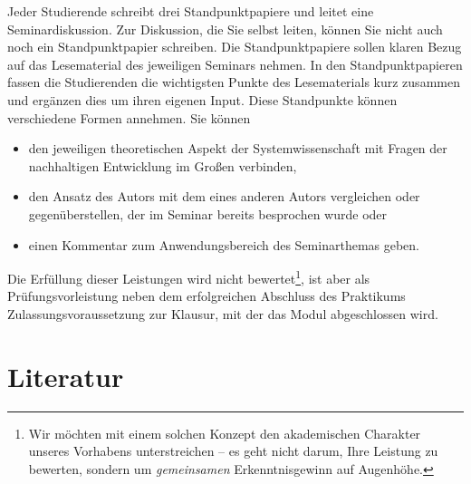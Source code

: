 \documentclass[11pt,a4paper]{article}
\begin{document}
Jeder Studierende schreibt drei Standpunktpapiere und leitet eine
Seminardiskussion.  Zur Diskussion, die Sie selbst leiten, können Sie nicht
auch noch ein Standpunktpapier schreiben. Die Standpunktpapiere sollen klaren
Bezug auf das Lesematerial des jeweiligen Seminars nehmen. In den
Standpunktpapieren fassen die Studierenden die wichtigsten Punkte des
Lesematerials kurz zusammen und ergänzen dies um ihren eigenen Input. Diese
Standpunkte können verschiedene Formen annehmen. Sie können
\begin{itemize}
\item den jeweiligen theoretischen Aspekt der Systemwissenschaft mit Fragen
  der nachhaltigen Entwicklung im Großen verbinden,
\item den Ansatz des Autors mit dem eines anderen Autors vergleichen oder
  gegenüberstellen, der im Seminar bereits besprochen wurde oder
\item einen Kommentar zum Anwendungsbereich des Seminarthemas geben.
\end{itemize}
Die Erfüllung dieser Leistungen wird nicht bewertet\footnote{Wir möchten mit
  einem solchen Konzept den akademischen Charakter unseres Vorhabens
  unterstreichen -- es geht nicht darum, Ihre Leistung zu bewerten, sondern um
  \emph{gemeinsamen} Erkenntnisgewinn auf Augenhöhe.}, ist aber als
Prüfungsvorleistung neben dem erfolgreichen Abschluss des Praktikums
Zulassungsvoraussetzung zur Klausur, mit der das Modul abgeschlossen wird.

\section{Literatur}
\end{document}
